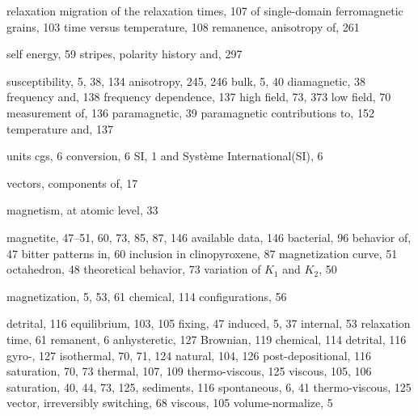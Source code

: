 \documentclass[,plain]{tauxe}
\begin{document}
\begin{theindex}
\subitem relaxation
    \subsubitem migration of the relaxation times, 107
    \subsubitem of single-domain ferromagnetic grains, 103
    \subsubitem time versus temperature, 108
  \subitem remanence, anisotropy of, 261

  \subitem self energy, 59
  \subitem stripes, polarity history and, 297
  
  \subitem susceptibility, 5, 38, 134
      \subsubitem anisotropy, 245, 246
      \subsubitem bulk, 5, 40
      \subsubitem diamagnetic, 38
      \subsubitem frequency and, 138
      \subsubitem frequency dependence, 137
      \subsubitem high field, 73, 373
      \subsubitem low field, 70
      \subsubitem measurement of, 136
      \subsubitem paramagnetic, 39
      \subsubitem paramagnetic contributions to, 152
      \subsubitem temperature and, 137
 
\subitem units
      \subsubitem cgs, 6
      \subsubitem conversion, 6
      \subsubitem SI, 1
\subsubitem and Syst\` eme International\break (SI), 6  
 
\subitem vectors, components of, 17
  

 \item magnetism, at atomic level, 33
  \item magnetite, 47--51, 60, 73, 85, 87, 146
    \subitem available data, 146
    \subitem bacterial, 96
    \subitem behavior of, 47
    \subitem bitter patterns in, 60
    \subitem inclusion in clinopyroxene, 87
    \subitem magnetization curve, 51
    \subitem octahedron, 48
    \subitem theoretical behavior, 73
    \subitem variation of $K_1$ and $K_2$, 50
  \item magnetization, 5, 53, 61
	\subitem chemical, 114
	\subitem configurations, 56
	
\subitem detrital, 116
    \subitem equilibrium, 103, 105
    \subitem  fixing, 47
	\subitem induced, 5, 37
    \subitem internal, 53
    \subitem relaxation time, 61
    \subitem remanent, 6
      \subsubitem anhysteretic, 127
      \subsubitem Brownian, 119
      \subsubitem chemical, 114
      \subsubitem detrital, 116
      \subsubitem gyro-, 127
      \subsubitem isothermal, 70, 71, 124
      \subsubitem natural, 104, 126
      \subsubitem post-depositional, 116
      \subsubitem saturation, 70, 73
      \subsubitem thermal, 107, 109
      \subsubitem thermo-viscous, 125
      \subsubitem viscous, 105, 106
    \subitem saturation, 40, 44, 73, 125,
	\subitem sediments, 116
    \subitem spontaneous, 6, 41
	\subitem thermo-viscous, 125
	\subitem vector, irreversibly switching, 68
\subitem viscous, 105
	\subitem volume-normalize, 5
  

\end{theindex}
\end{document}
